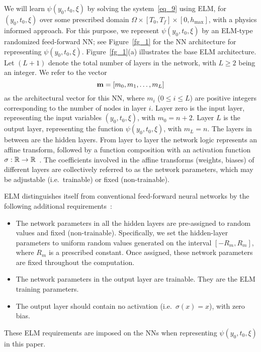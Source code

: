 
We will learn $\psi(y_0,t_0,\xi)$ by solving the system~\eqref{eq_9}
using ELM, for $(y_0,t_0,\xi)$ over some prescribed domain
$\Omega\times[T_0,T_f]\times[0,h_{\max}]$,  with  a physics informed approach.
For this purpose, we represent $\psi(y_0,t_0,\xi)$ by an ELM-type randomized
feed-forward NN; see Figure~\ref{fg_1} for
the NN architecture for representing $\psi(y_0,t_0,\xi)$.
%
Figure~\ref{fg_1}(a) illustrates the base ELM  architecture.
Let $(L+1)$ denote the total number of layers in the network,
with $L\geqslant 2$ being an integer. We refer to the vector
\begin{equation}\label{eq_10}
  \mathbf{m} = [m_0, m_1, \dots, m_L]
\end{equation}
as the architectural vector for this NN,
where $m_i$ ($0\leqslant i\leqslant L$) are positive integers
corresponding to the number of nodes in layer $i$.
Layer zero is the input layer, representing the input variables
$(y_0,t_0,\xi)$, with $m_0=n+2$. Layer
$L$ is the output layer, representing the function $\psi(y_0,t_0,\xi)$,
with $m_L=n$. The layers in between
are the hidden layers. From layer to layer the network logic
represents an affine transform, followed by a function composition
with an activation function
$\sigma: \mathbb{R}\rightarrow \mathbb{R}$~\cite{GoodfellowBC2016}.
The coefficients involved in the affine transforms (weights, biases) of different
layers are collectively referred to
as the network parameters, which may be adjustable (i.e.~trainable)
or fixed (non-trainable).

ELM distinguishes itself from
conventional feed-forward neural networks by the following additional
requirements~\cite{DongL2021,HuangZS2006}:
\begin{itemize}
\item The network parameters in all the hidden layers are pre-assigned to
  random values and fixed (non-trainable). Specifically, we
  set the hidden-layer parameters to uniform random values
  generated on the interval $[-R_m,R_m]$, where $R_m$ is a prescribed constant.
  Once assigned, these network parameters are fixed
  throughout the computation.
\item The network parameters in the output layer are trainable. They are
  the ELM training parameters.
\item The output layer should contain no activation (i.e.~$\sigma(x)=x$),
  with zero bias.
\end{itemize}
These ELM requirements  are imposed on the NNs  when representing
$\psi(y_0,t_0,\xi)$ in this paper.


